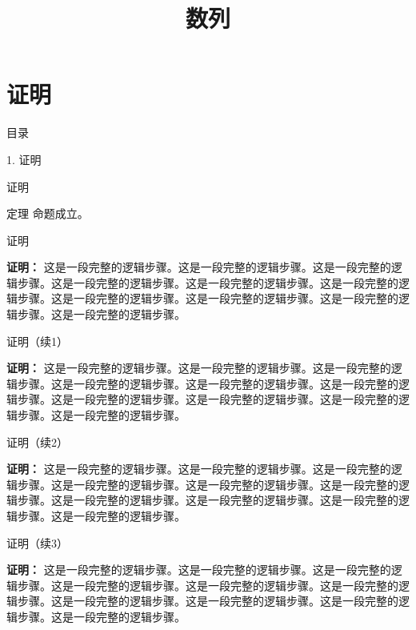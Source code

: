 \documentclass[aspectratio=169,10pt,fontset=fandol]{ctexbeamer}
\title{数列}
\begin{document}
\section{证明}
\begin{frame}[t,fragile]{目录}
\normalsize
{\color{blue}\normalsize 1. 证明\par}\vspace{0.3em}
\end{frame}
\begin{frame}[t,fragile]{证明}
\footnotesize
\begin{block}{定理}
{\footnotesize
命题成立。
}
\end{block}
\end{frame}
\begin{frame}[t,fragile]{证明}
\footnotesize
{\footnotesize
\textbf{证明：}
这是一段完整的逻辑步骤。这是一段完整的逻辑步骤。这是一段完整的逻辑步骤。这是一段完整的逻辑步骤。这是一段完整的逻辑步骤。这是一段完整的逻辑步骤。这是一段完整的逻辑步骤。这是一段完整的逻辑步骤。这是一段完整的逻辑步骤。这是一段完整的逻辑步骤。


}
\end{frame}
\begin{frame}[t,fragile]{证明（续1）}
\footnotesize
{\footnotesize
\textbf{证明：}
这是一段完整的逻辑步骤。这是一段完整的逻辑步骤。这是一段完整的逻辑步骤。这是一段完整的逻辑步骤。这是一段完整的逻辑步骤。这是一段完整的逻辑步骤。这是一段完整的逻辑步骤。这是一段完整的逻辑步骤。这是一段完整的逻辑步骤。这是一段完整的逻辑步骤。


}
\end{frame}
\begin{frame}[t,fragile]{证明（续2）}
\footnotesize
{\footnotesize
\textbf{证明：}
这是一段完整的逻辑步骤。这是一段完整的逻辑步骤。这是一段完整的逻辑步骤。这是一段完整的逻辑步骤。这是一段完整的逻辑步骤。这是一段完整的逻辑步骤。这是一段完整的逻辑步骤。这是一段完整的逻辑步骤。这是一段完整的逻辑步骤。这是一段完整的逻辑步骤。


}
\end{frame}
\begin{frame}[t,fragile]{证明（续3）}
\footnotesize
{\footnotesize
\textbf{证明：}
这是一段完整的逻辑步骤。这是一段完整的逻辑步骤。这是一段完整的逻辑步骤。这是一段完整的逻辑步骤。这是一段完整的逻辑步骤。这是一段完整的逻辑步骤。这是一段完整的逻辑步骤。这是一段完整的逻辑步骤。这是一段完整的逻辑步骤。这是一段完整的逻辑步骤。


}
\end{frame}
\end{document}
